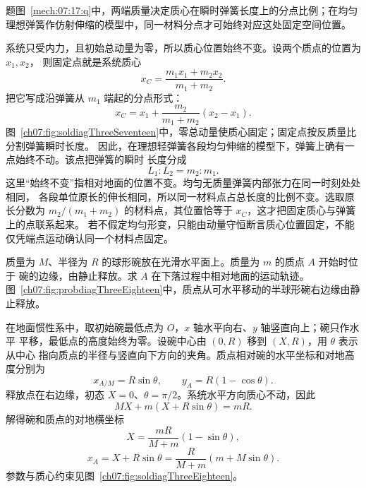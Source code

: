 {\begin{origexamplebox}{}
\begin{qualityfigure}
\label{mech:07:17:q}
\end{qualityfigure}
\end{origexamplebox}

\begin{xesolution}题图~\ref{mech:07:17:q}中，两端质量决定质心在瞬时弹簧长度上的分点比例；在均匀理想弹簧作仿射伸缩的模型中，同一材料分点才可始终对应这处固定空间位置。

系统只受内力，且初始总动量为零，所以质心位置始终不变。设两个质点的位置为 $x_1,x_2$，
则固定点就是系统质心
\[
 x_C=\frac{m_1x_1+m_2x_2}{m_1+m_2}.
\]
把它写成沿弹簧从 $m_1$ 端起的分点形式：
\[
 x_C=x_1+\frac{m_2}{m_1+m_2}(x_2-x_1).
\]
图~\ref{ch07:fig:soldiagThreeSeventeen}中，零总动量使质心固定；固定点按反质量比分割弹簧瞬时长度。
\soldiagThreeSeventeen
因此，在理想轻弹簧各段均匀伸缩的模型下，弹簧上确有一点始终不动。该点把弹簧的瞬时
长度分成
\[
 \boxed{L_1:L_2=m_2:m_1}.
\]
这里“始终不变”指相对地面的位置不变。均匀无质量弹簧内部张力在同一时刻处处相同，
各段单位原长的伸长相同，所以同一材料点占总长度的比例不变。选取原长分数为
$m_2/(m_1+m_2)$ 的材料点，其位置恰等于 $x_C$，这才把固定质心与弹簧上的点联系起来。
若不假定均匀形变，只能由动量守恒断言质心位置固定，不能仅凭端点运动确认同一个材料点固定。
\end{xesolution}

\begin{origexamplebox}{}\label{ch07:ex:s08-3-18}
质量为 $M$、半径为 $R$ 的球形碗放在光滑水平面上。质量为 $m$ 的质点 $A$ 开始时位于
碗的边缘，由静止释放。求 $A$ 在下落过程中相对地面的运动轨迹。
图~\ref{ch07:fig:probdiagThreeEighteen}中，质点从可水平移动的半球形碗右边缘由静止释放。
\probdiagThreeEighteen
\end{origexamplebox}

\begin{xesolution}
在地面惯性系中，取初始碗最低点为 $O$，$x$ 轴水平向右、$y$ 轴竖直向上；碗只作水平
平移，最低点的高度始终为零。设碗中心由 $(0,R)$ 移到 $(X,R)$，用 $\theta$ 表示从中心
指向质点的半径与竖直向下方向的夹角。质点相对碗的水平坐标和对地高度分别为
\[
 x_{A/M}=R\sin\theta,
 \qquad
 y_A=R(1-\cos\theta).
\]
释放点在右边缘，初态 $X=0$、$\theta=\pi/2$。系统水平方向质心不动，因此
\[
 MX+m(X+R\sin\theta)=mR.
\]
解得碗和质点的对地横坐标
\[
 X=\frac{mR}{M+m}(1-\sin\theta),
\]
\[
 x_A=X+R\sin\theta
 =\frac{R}{M+m}(m+M\sin\theta).
\]
参数与质心约束见图~\ref{ch07:fig:soldiagThreeEighteen}。


\end{xesolution}}
